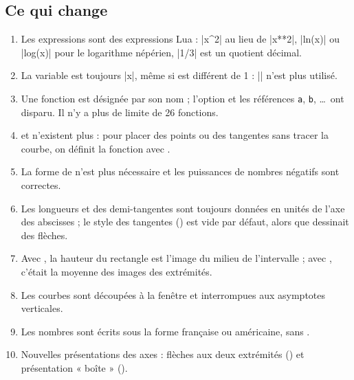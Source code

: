 \subsection{Ce qui change}

\begin{enumerate}
  \item Les expressions sont des expressions Lua : |x^2| au lieu de |x**2|, |ln(x)| ou |log(x)| pour le logarithme népérien, |1/3| est un quotient décimal.
  \item La variable est toujours |x|, même si  est différent de 1 : |\x| n'est plus utilisé.
  \item Une fonction est désignée par son nom ; l'option  et les références \texttt{a}, \texttt{b}, \dots\ ont disparu. Il n'y a plus de limite de 26 fonctions.
  \item {} et  n'existent plus : pour placer des points ou des tangentes sans tracer la courbe, on définit la fonction avec .
  \item La forme de  n'est plus nécessaire et les puissances de nombres négatifs sont correctes.
  \item Les longueurs  et  des demi-tangentes sont toujours données en unités de l'axe des abscisses ; le style des tangentes () est vide par défaut, alors que  dessinait des flèches.
  \item Avec , la hauteur du rectangle est l'image du milieu de l'intervalle ; avec , c'était la moyenne des images des extrémités.
  \item Les courbes sont découpées à la fenêtre et interrompues aux asymptotes verticales.
  \item Les nombres sont écrits sous la forme française ou américaine, sans .
  \item Nouvelles présentations des axes : flèches aux deux extrémités () et présentation « boîte » ().
\end{enumerate}

\endinput

